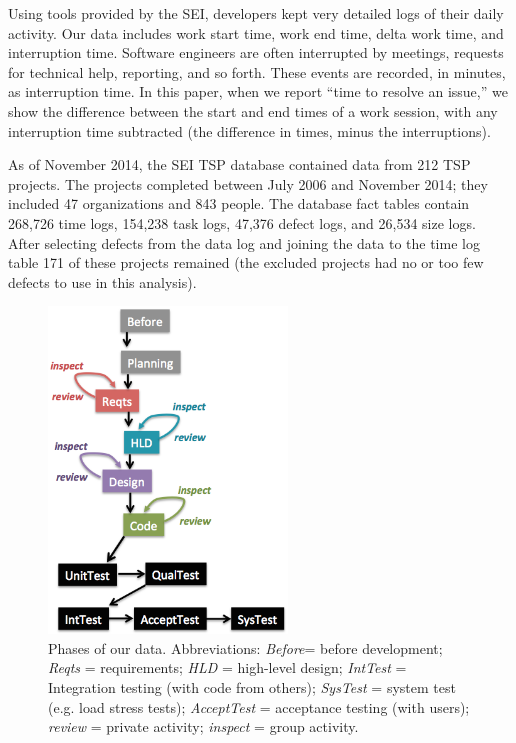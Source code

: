 Using tools provided by the SEI, developers kept very detailed logs of their daily activity. Our data includes  work start time, work end time,  delta
work time, and interruption time. Software engineers are often
interrupted by meetings, requests for technical help, reporting, and
so forth. These events are recorded, in minutes, as interruption
time.  
In this paper, when we report ``time to resolve an
issue,'' we show the difference between the start and end times
of a work session, with any interruption time subtracted (the
difference in times, minus the interruptions). 

As of November 2014, the SEI TSP database contained data from 212
TSP projects. The projects completed between July 2006 and
November 2014; they included 47 organizations and 843 people. 
The database fact tables
contain 268,726 time logs, 
154,238 task logs,
 47,376 defect logs, 
and 26,534 size logs. 
After selecting defects from the data log and joining the data to the time log table  171 of these projects remained (the excluded projects had no or too few defects to use in this analysis).

\begin{figure}[!b]  
\begin{center}
\includegraphics[width=2.5in]{img/waterfall-v3.png}  
\end{center}
\caption{Phases of our data.
Abbreviations: \newline
{\em Before}= before development;\newline
{\em Reqts}	  = requirements;\newline
{\em HLD}	  = high-level design;\newline
{\em IntTest} = Integration testing (with code from others);\newline
{\em SysTest} = system test (e.g. load stress tests);\newline
{\em AcceptTest}  = acceptance testing (with users);\newline
{\em review}        = private activity;\newline
{\em inspect}        = group activity.}
\label{fig:waterfall}
\end{figure}


